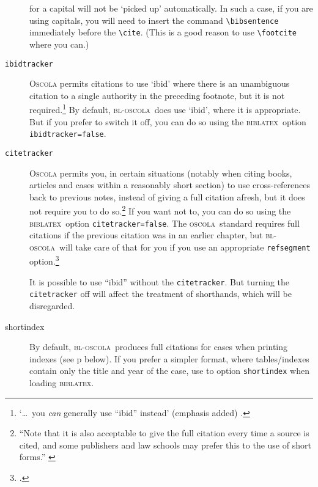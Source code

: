 \documentclass[a5paper,fontsize=9pt,DIV=1]{scrartcl}
\newcommand{\oscola}{\textsc{bl-oscola}}
\newcommand{\biblatex}{\textsc{biblatex}}
\newcommand{\oscolashort}{\textsc{oscola}\nocite{oscola}}
\begin{document}
\begin{description}
  for a capital will not be `picked up' automatically. In such a case,
  if you are using capitals, you will need to insert the command
  \verb|\bibsentence| immediately before the \verb|\cite|. (This is a
  good reason to use \verb|\footcite| where you can.\label{ibidstyle})
\item[\texttt{ibidtracker}] 
   \textsc{Oscola} permits
  citations to use `ibid' where there is an unambiguous citation to a
  single authority in the preceding footnote, but it is not
  required.\footnote{`\ldots\ you \emph{can} generally use ``ibid''
    instead' (emphasis added) \cite[5]{oscola}.} By default,
  \oscola\ does use `ibid', where it is appropriate. But if you prefer
  to switch it off, you can do so using the \biblatex\ option
  \texttt{ibidtracker=false}.
\item[\texttt{citetracker}]
                  \textsc{Oscola} permits you, in certain situations (notably
  when citing books, articles and cases within a reasonably short
  section) to use cross-references back to previous notes, instead of
  giving a full citation afresh, but it does not require you to do
  so.\footnote{\enquote{Note that it is also acceptable to give the
      full citation every time a source is cited, and some publishers
      and law schools may prefer this to the use of short forms.}
    \cite[5]{oscola}} If you want not to, you can do so using the
  \biblatex\ option \texttt{citetracker={}false}. The \oscolashort\
  standard requires full citations if the previous citation was
  in an earlier chapter, but \oscola\ will take care of that for
  you if you use an appropriate \texttt{refsegment} option.\footcite[57]{biblatex2}

It is possible to use \enquote{ibid} without the
\verb|citetracker|. But turning the \verb|citetracker| off will affect
the treatment of shorthands, which will be disregarded.
\item[shortindex] By default, \oscola\ produces full citations for
  cases when printing indexes (see p \pageref{index:format} below). If
  you prefer a simpler format, where tables\slash indexes contain only
  the title and year of the case, use to option \texttt{shortindex}
  when loading \biblatex.
\end{description}
\end{document}
